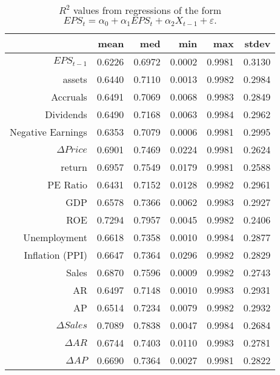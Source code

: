 \begin{table}[H]
\centering
\begin{tabular}{rrrrrr}
  \hline
 & mean & med & min & max & stdev \\ 
  \hline
$EPS_{t-1}$ & 0.6226 & 0.6972 & 0.0002 & 0.9981 & 0.3130 \\ 
assets & 0.6440 & 0.7110 & 0.0013 & 0.9982 & 0.2984 \\ 
  Accruals & 0.6491 & 0.7069 & 0.0068 & 0.9983 & 0.2849 \\ 
  Dividends & 0.6490 & 0.7168 & 0.0063 & 0.9984 & 0.2962 \\ 
  Negative Earnings & 0.6353 & 0.7079 & 0.0006 & 0.9981 & 0.2995 \\ 
  $\Delta Price$ & 0.6901 & 0.7469 & 0.0224 & 0.9981 & 0.2624 \\ 
  return & 0.6957 & 0.7549 & 0.0179 & 0.9981 & 0.2588 \\ 
  PE Ratio & 0.6431 & 0.7152 & 0.0128 & 0.9982 & 0.2961 \\ 
  GDP & 0.6578 & 0.7366 & 0.0062 & 0.9983 & 0.2927 \\ 
  ROE & 0.7294 & 0.7957 & 0.0045 & 0.9982 & 0.2406 \\ 
  Unemployment & 0.6618 & 0.7358 & 0.0010 & 0.9984 & 0.2877 \\ 
  Inflation (PPI) & 0.6647 & 0.7364 & 0.0296 & 0.9982 & 0.2829 \\ 
  Sales & 0.6870 & 0.7596 & 0.0009 & 0.9982 & 0.2743 \\ 
  AR & 0.6497 & 0.7148 & 0.0010 & 0.9983 & 0.2931 \\ 
  AP & 0.6514 & 0.7234 & 0.0079 & 0.9982 & 0.2932 \\ 
$\Delta Sales$ & 0.7089 & 0.7838 & 0.0047 & 0.9984 & 0.2684 \\ 
$\Delta AR$ & 0.6744 & 0.7403 & 0.0110 & 0.9983 & 0.2781 \\ 
$\Delta AP$ & 0.6690 & 0.7364 & 0.0027 & 0.9981 & 0.2822 \\ 
   \hline
\end{tabular}
\captionsetup{width=4in, font=footnotesize}
\caption{$R^2$ values from regressions of the form $EPS_{t} = \alpha_0 + \alpha_{1}EPS_{t} + \alpha_{2}X_{t-1} +\varepsilon.$} 
\label{univariate-stats-eps-rsquared}
\end{table}